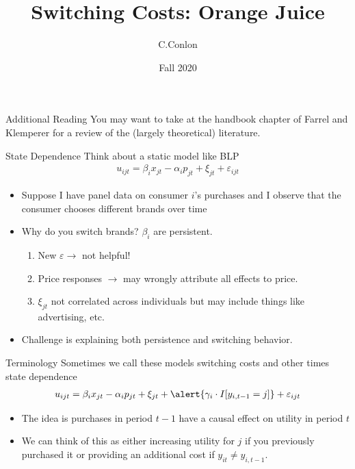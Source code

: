 \documentclass[xcolor=pdftex,dvipsnames,table,mathserif,aspectratio=169]{beamer}
\title [Dynamic Oligopoly I]{Switching Costs: Orange Juice}
\author{C.Conlon }
\institute{Grad IO }
\date{Fall 2020}
\begin{document}
\begin{frame}
\titlepage
\end{frame}


\begin{frame}{Additional Reading}
You may want to take at the handbook chapter of Farrel and Klemperer for a review of the (largely theoretical) literature.

\end{frame}
\begin{frame}{State Dependence}
Think about a static model like BLP
\begin{eqnarray*}
u_{ijt} = \beta_i x_{jt} - \alpha_i p_{jt} + \xi_{jt} + \varepsilon_{ijt}
\end{eqnarray*}
\begin{itemize}
\item Suppose I have panel data on consumer $i$'s purchases and I observe that the consumer chooses different brands over time
\item Why do you switch brands?  $\beta_i$ are persistent.
\begin{enumerate}
\item New $\varepsilon \rightarrow$ not helpful!
\item Price responses $\rightarrow$ may wrongly attribute all effects to price.
\item $\xi_{jt}$ not correlated across individuals but may include things like advertising, etc.
\end{enumerate}
\item Challenge is explaining both \alert{persistence} and \alert{switching} behavior.
\end{itemize}
\end{frame} 



\begin{frame}{Terminology}
Sometimes we call these models \alert{switching costs} and other times \alert{state dependence}
\begin{eqnarray*}
u_{ijt} = \beta_i x_{jt} - \alpha_i p_{jt} + \xi_{jt} + \alert{\gamma_i \cdot I[y_{i,t-1}=j]} + \varepsilon_{ijt} 
\end{eqnarray*}
\begin{itemize}
\item The idea is purchases in period $t-1$ have a causal effect on utility in period $t$
\item We can think of this as either increasing utility for $j$ if you previously purchased it or providing an additional cost if $y_{it} \neq y_{i,t-1}$.
\end{itemize}
\end{frame} 
\end{document}
